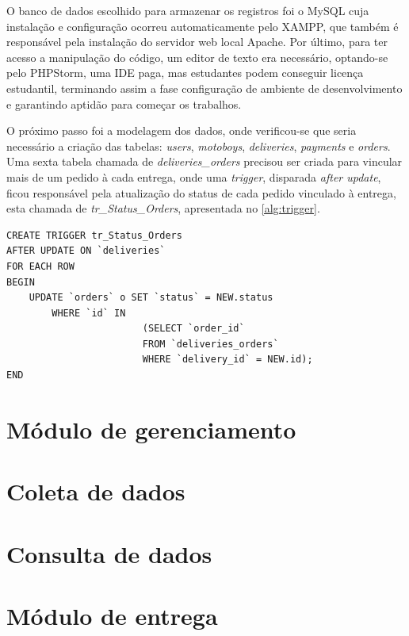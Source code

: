 O banco de dados escolhido para armazenar os registros foi o MySQL cuja instalação e configuração ocorreu automaticamente pelo XAMPP, que também é responsável pela instalação do servidor web local Apache. Por último, para ter acesso a manipulação do código, um editor de texto era necessário, optando-se pelo PHPStorm, uma IDE paga, mas estudantes podem conseguir licença estudantil, terminando assim a fase configuração de ambiente de desenvolvimento e garantindo aptidão para começar os trabalhos.

O próximo passo foi a modelagem dos dados, onde verificou-se que seria necessário a criação das tabelas: \textit{users}, \textit{motoboys}, \textit{deliveries}, \textit{payments} e \textit{orders}. Uma sexta tabela chamada de \textit{deliveries\_orders} precisou ser criada para vincular mais de um pedido à cada entrega, onde uma \textit{trigger}, disparada \textit{after update}, ficou responsável pela atualização do status de cada pedido vinculado à entrega, esta chamada de \textit{tr\_Status\_Orders}, apresentada no \autoref{alg:trigger}.

\begin{lstlisting}[caption={Trigger tr\_Status\_Orders}, label=alg:trigger, style=SQL]
CREATE TRIGGER tr_Status_Orders 
AFTER UPDATE ON `deliveries`
FOR EACH ROW 
BEGIN
    UPDATE `orders` o SET `status` = NEW.status
        WHERE `id` IN
                        (SELECT `order_id`
                        FROM `deliveries_orders`
                        WHERE `delivery_id` = NEW.id); 
END
\end{lstlisting}

\newpage
\section{Módulo de gerenciamento}


\newpage
\section{Coleta de dados}


\newpage
\section{Consulta de dados}


\newpage
\section{Módulo de entrega}



